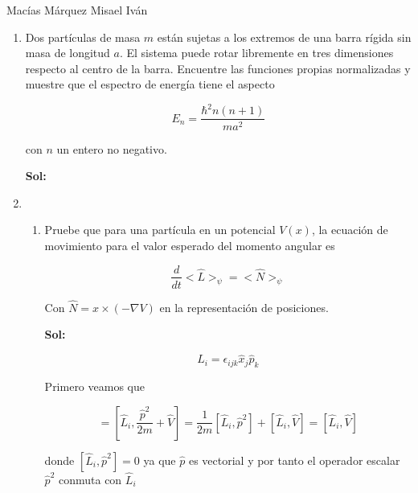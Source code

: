\documentclass[12pt,a4paper]{article}
\begin{document}
Macías Márquez Misael Iván

\begin{enumerate}






\item Dos partículas de masa $m$ están sujetas a los extremos de una barra rígida sin masa de longitud $a$. El sistema puede rotar libremente en tres dimensiones respecto al centro de la barra. Encuentre las funciones propias normalizadas y muestre que el espectro de energía tiene el aspecto

\begin{equation*}
    E_n = \frac{\hbar^2 n (n+1)}{ma^2}
\end{equation*}

con $n$ un entero no negativo.

\textbf{Sol:}






\item \begin{enumerate}
    \item  Pruebe que para una partícula en un potencial $V(x)$, la ecuación de movimiento para el valor esperado del momento angular es
    
    \begin{equation*}
        \frac{d}{dt} <\hat{L}>_{\psi} = <\hat{N}>_{\psi}
    \end{equation*}
    
    Con $\hat{N} = x \times (- \nabla V)$ en la representación  de posiciones.
    
    \textbf{Sol:}
    
    \begin{equation*}
        L_i = \epsilon_{ijk} \hat{x}_{j} \hat{p}_{k}
    \end{equation*}
    
    Primero veamos que
    
    \begin{equation*}
        [\hat{L}_{i}, \hat{H}] = [\hat{L}_{i} , \frac{\hat{p}^2}{2m} + \hat{V}] = \frac{1}{2m} [\hat{L}_{i},\hat{p}^2] + [\hat{L}_{i}, \hat{V}] = [\hat{L}_{i}, \hat{V}]
    \end{equation*}
    
    donde $[\hat{L}_{i},\hat{p}^2] = 0$ ya que $\hat{p}$ es vectorial y por tanto el operador escalar $\hat{p}^2$ conmuta con $\hat{L}_{i}$
    

\end{enumerate}
\end{enumerate}
\end{document}
